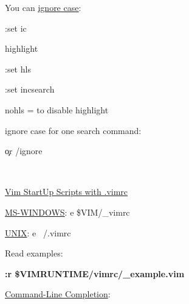 \documentclass[12pt, letterpaper]{article}
\begin{document}
\begin{flushleft}
You can \underline{\underline{ignore case}}: \\
\par

:set ic \\
\par

highlight \\
\par

:set hls \\
\par

:set incsearch \\
\par

nohls = to disable highlight \\
\par

ignore case for one search command: \par
\c or /ignore\c \\
\par

 \\
\par

\underline{Vim StartUp Scripts with .vimrc} \\
\par

\underline{MS-WINDOWS}: e \$VIM/\_vimrc \\
\par

\underline{UNIX}: e ~/.vimrc \\
\par
Read examples:

\textbf{:r \$VIMRUNTIME/vimrc/\_example.vim} \\
\par

\underline{Command-Line Completion}: \\
\par

\begin{enumerate}


\end{enumerate}
\end{flushleft}
\end{document}
